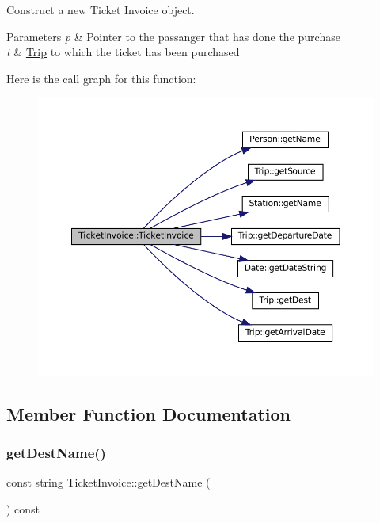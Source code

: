 Construct a new Ticket Invoice object. 


\begin{DoxyParams}{Parameters}
{\em p} & Pointer to the passanger that has done the purchase \\
\hline
{\em t} & \mbox{\hyperlink{classTrip}{Trip}} to which the ticket has been purchased \\
\hline
\end{DoxyParams}
Here is the call graph for this function\+:
\nopagebreak
\begin{figure}[H]
\begin{center}
\leavevmode
\includegraphics[width=350pt]{classTicketInvoice_a38b37e5168ce71bbf37aceef8a6f6267_cgraph}
\end{center}
\end{figure}


\subsection{Member Function Documentation}
\mbox{\label{classTicketInvoice_a1db4ffac81e11b765c6204278a3df8ff}} 
\subsubsection{\texorpdfstring{get\+Dest\+Name()}{getDestName()}}
{\footnotesize\ttfamily const string Ticket\+Invoice\+::get\+Dest\+Name (\begin{DoxyParamCaption}{ }\end{DoxyParamCaption}) const}



